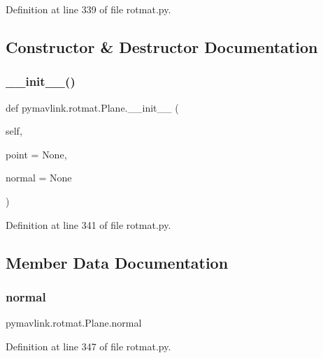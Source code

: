 Definition at line 339 of file rotmat.\+py.



\subsection{Constructor \& Destructor Documentation}
\mbox{\label{classpymavlink_1_1rotmat_1_1Plane_abb7f1250507e4cc5416009975337e80e}} 
\subsubsection{\texorpdfstring{\_\_init\_\_()}{\_\_init\_\_()}}
{\footnotesize\ttfamily def pymavlink.\+rotmat.\+Plane.\+\_\+\+\_\+init\+\_\+\+\_\+ (\begin{DoxyParamCaption}\item[{}]{self,  }\item[{}]{point = {\ttfamily None},  }\item[{}]{normal = {\ttfamily None} }\end{DoxyParamCaption})}



Definition at line 341 of file rotmat.\+py.



\subsection{Member Data Documentation}
\mbox{\label{classpymavlink_1_1rotmat_1_1Plane_ad5fafc28ce87e911182fd5f4cf8f53d1}} 
\subsubsection{\texorpdfstring{normal}{normal}}
{\footnotesize\ttfamily pymavlink.\+rotmat.\+Plane.\+normal}



Definition at line 347 of file rotmat.\+py.

\mbox{\label{classpymavlink_1_1rotmat_1_1Plane_aecbe2c0258b7dfa90fe10651aa4b33c1}} 
